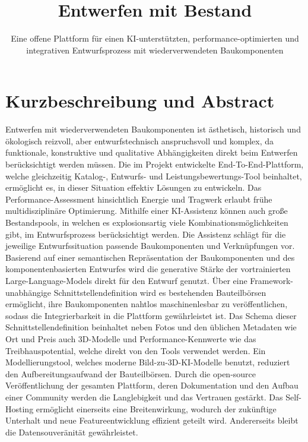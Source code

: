 \documentclass[type=forschungsbericht]{zukunftbau}
\title{Entwerfen mit Bestand}
\subtitle{Eine offene Plattform für einen KI-unterstützten, performance-optimierten und integrativen Entwurfsprozess mit wiederverwendeten Baukomponenten}
\begin{document}
\makecoverpages

\maketableofcontents

\makefundingacknowledgement

\makemainmatter


\chapter*{Kurzbeschreibung und Abstract}

Entwerfen mit wiederverwendeten Baukomponenten ist ästhetisch, historisch und ökologisch reizvoll, aber entwurfstechnisch anspruchsvoll und komplex, da funktionale, konstruktive und qualitative Abhängigkeiten direkt beim Entwerfen berücksichtigt werden müssen.
Die im Projekt entwickelte End-To-End-Plattform, welche gleichzeitig Katalog-, Entwurfs- und Leistungsbewertungs-Tool beinhaltet, ermöglicht es, in dieser Situation effektiv Lösungen zu entwickeln.
Das Performance-Assessment hinsichtlich Energie und Tragwerk erlaubt frühe multidisziplinäre Optimierung.
Mithilfe einer KI-Assistenz können auch große Bestandspools, in welchen es explosionsartig viele Kombinationsmöglichkeiten gibt, im Entwurfsprozess berücksichtigt werden.
Die Assistenz schlägt für die jeweilige Entwurfssituation passende Baukomponenten und Verknüpfungen vor.
Basierend auf einer semantischen Repräsentation der Baukomponenten und des komponentenbasierten Entwurfes wird die generative Stärke der vortrainierten Large-Language-Models direkt für den Entwurf genutzt.
Über eine Framework-unabhängige Schnittstellendefinition wird es bestehenden Bauteilbörsen ermöglicht, ihre Baukomponenten nahtlos maschinenlesbar zu veröffentlichen, sodass die Integrierbarkeit in die Plattform gewährleistet ist.
Das Schema dieser Schnittstellendefinition beinhaltet neben Fotos und den üblichen Metadaten wie Ort und Preis auch 3D-Modelle und Performance-Kennwerte wie das Treibhauspotential, welche direkt von den Tools verwendet werden.
Ein Modellierungstool, welches moderne Bild-zu-3D-KI-Modelle benutzt, reduziert den Aufbereitungsaufwand der Bauteilbörsen.
Durch die open-source Veröffentlichung der gesamten Plattform, deren Dokumentation und den Aufbau einer Community werden die Langlebigkeit und das Vertrauen gestärkt.
Das Self-Hosting ermöglicht einerseits eine Breitenwirkung, wodurch der zukünftige Unterhalt und neue Featureentwicklung effizient geteilt wird.
Andererseits bleibt die Datensouveränität gewährleistet.
\end{document}
